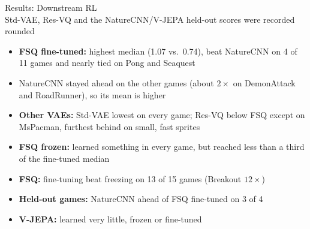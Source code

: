 \documentclass[aspectratio=43,10pt]{beamer}
\begin{document}
\begin{frame}{Results: Downstream RL}
  \centering
  {\footnotesize\setlength{\tabcolsep}{2.5pt}
  }\\[0.2em]
  {\tiny Std-VAE, Res-VQ and the NatureCNN/V-JEPA held-out scores were recorded rounded}
  \vspace{0.2em}
  \begin{itemize}\small\setlength\itemsep{0.12em}
    \item \textbf{FSQ fine-tuned:} highest median (1.07 vs.\ 0.74), beat NatureCNN on 4 of 11
          games and nearly tied on Pong and Seaquest
    \item NatureCNN stayed ahead on the other games (about $2\times$ on DemonAttack and
          RoadRunner), so its mean is higher
    \item \textbf{Other VAEs:} Std-VAE lowest on every game; Res-VQ below FSQ except on MsPacman,
          furthest behind on small, fast sprites
    \item \textbf{FSQ frozen:} learned something in every game, but reached less than a third
          of the fine-tuned median
    \item \textbf{FSQ:} fine-tuning beat freezing on 13 of 15 games (Breakout $12\times$)
    \item \textbf{Held-out games:} NatureCNN ahead of FSQ fine-tuned on 3 of 4
    \item \textbf{V-JEPA:} learned very little, frozen or fine-tuned
  \end{itemize}
\end{frame}
\end{document}
